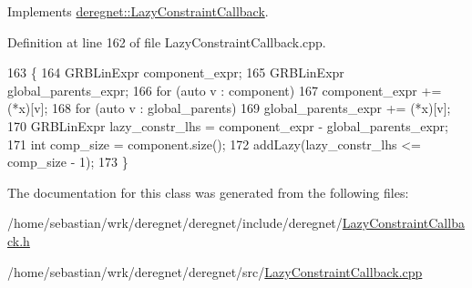 Implements \hyperlink{classderegnet_1_1LazyConstraintCallback_a8f6db7da84271afcd2e2169318569558}{deregnet\+::\+Lazy\+Constraint\+Callback}.



Definition at line 162 of file Lazy\+Constraint\+Callback.\+cpp.


\begin{DoxyCode}
163                                                                                          \{
164     GRBLinExpr component\_expr;
165     GRBLinExpr global\_parents\_expr;
166     \textcolor{keywordflow}{for} (\textcolor{keyword}{auto} v : component)
167         component\_expr += (*x)[v];
168     \textcolor{keywordflow}{for} (\textcolor{keyword}{auto} v : global\_parents)
169         global\_parents\_expr += (*x)[v];
170     GRBLinExpr lazy\_constr\_lhs = component\_expr - global\_parents\_expr;
171     \textcolor{keywordtype}{int} comp\_size = component.size();
172     addLazy(lazy\_constr\_lhs <= comp\_size - 1);
173 \}
\end{DoxyCode}


The documentation for this class was generated from the following files\+:\begin{DoxyCompactItemize}
\item 
/home/sebastian/wrk/deregnet/deregnet/include/deregnet/\hyperlink{LazyConstraintCallback_8h}{Lazy\+Constraint\+Callback.\+h}\item 
/home/sebastian/wrk/deregnet/deregnet/src/\hyperlink{LazyConstraintCallback_8cpp}{Lazy\+Constraint\+Callback.\+cpp}\end{DoxyCompactItemize}
